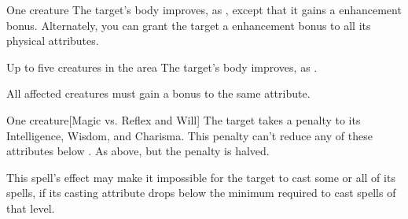 \begin{spellheader}
    \spellrng{\rngtouch}
    \spelldur{\durshort}
\end{spellheader}
\begin{spelleffects}
    \begin{spelltarget}{One creature}
        \spelleffect The target's body improves, as , except that it gains a  enhancement bonus. Alternately, you can grant the target a  enhancement bonus to all its physical attributes.
    \end{spelltarget}
\end{spelleffects}

\begin{spellheader}
\end{spellheader}
\begin{spelleffects}
    \begin{spelltargets}{Up to five creatures in the area}
        \spelleffect The target's body improves, as . 
    \end{spelltargets}
\end{spelleffects}
\begin{spellfooter}
    \spellnotes All affected creatures must gain a bonus to the same attribute.
\end{spellfooter}

\begin{spellheader}
    \spelldur{\durshort}
\end{spellheader}
\begin{spelleffects}
    \begin{spelltarget}{One creature}[Magic vs. Reflex and Will]
        \spellsuccess[Reflex] The target takes a  penalty to its Intelligence, Wisdom, and Charisma. This penalty can't reduce any of these attributes below .
        \spellfailure[Will] As above, but the penalty is halved.
    \end{spelltarget}
\end{spelleffects}
\begin{spellfooter}
    \spellnotes This spell's effect may make it impossible for the target to cast some or all of its spells, if its casting attribute drops below the minimum required to cast spells of that level.
\end{spellfooter}

